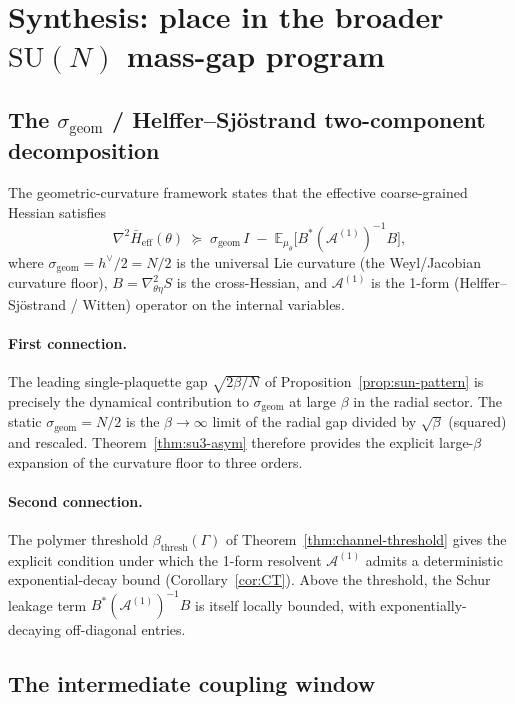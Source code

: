 \documentclass[11pt,a4paper]{article}
\theoremstyle{definition}
\newcommand{\SU}{\mathrm{SU}}
\newcommand{\E}{\mathbb{E}}
\begin{document}
\section{Synthesis: place in the broader $\SU(N)$ mass-gap program}
\label{sec:framework}

\subsection{The $\sigma_{\mathrm{geom}}$ / Helffer--Sj\"ostrand
two-component decomposition}

The geometric-curvature framework states that the effective
coarse-grained Hessian satisfies
\[
\nabla^2 \bar H_{\mathrm{eff}}(\theta)
\;\succeq\;
\sigma_{\mathrm{geom}}\,I
\;-\;
\E_{\mu_\theta}\big[B^*(\mathcal A^{(1)})^{-1}B\big],
\]
where $\sigma_{\mathrm{geom}} = h^\vee/2 = N/2$ is the universal Lie
curvature (the Weyl/Jacobian curvature floor), $B = \nabla^2_{\theta\eta}S$
is the cross-Hessian, and $\mathcal A^{(1)}$ is the 1-form
(Helffer--Sj\"ostrand / Witten) operator on the internal variables.

\paragraph{First connection.}
The leading single-plaquette gap $\sqrt{2\beta/N}$ of
Proposition~\ref{prop:sun-pattern} is precisely the dynamical
contribution to $\sigma_{\mathrm{geom}}$ at large $\beta$ in the radial
sector. The static $\sigma_{\mathrm{geom}} = N/2$ is the
$\beta\to\infty$ limit of the radial gap divided by $\sqrt\beta$
(squared) and rescaled. Theorem~\ref{thm:su3-asym} therefore
provides the explicit large-$\beta$ expansion of the curvature floor
to three orders.

\paragraph{Second connection.}
The polymer threshold $\beta_{\mathrm{thresh}}(\Gamma)$ of
Theorem~\ref{thm:channel-threshold} gives the explicit condition
under which the 1-form resolvent $\mathcal A^{(1)}$ admits a
deterministic exponential-decay bound (Corollary~\ref{cor:CT}).
Above the threshold, the Schur leakage term
$B^*(\mathcal A^{(1)})^{-1}B$ is itself locally bounded, with
exponentially-decaying off-diagonal entries.

\subsection{The intermediate coupling window}
\end{document}
